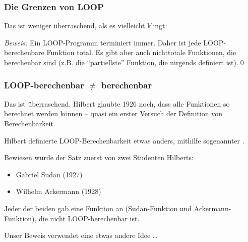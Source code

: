 \documentclass[aspectratio=1610,onlymath]{beamer}
\begin{document}
\begin{frame}\frametitle{Die Grenzen von LOOP}

\pause

Das ist weniger überraschend, als es vielleicht klingt:\smallskip

\emph{Beweis:} Ein LOOP-Programm terminiert immer. Daher ist jede LOOP-berechenbare Funktion total. Es gibt aber auch nichttotale Funktionen, die berechenbar sind (z.B. die ``partiellste'' Funktion, die nirgends definiert ist).\qed
% 
% 
% 

\end{frame}


\begin{frame}\frametitle{LOOP-berechenbar $\neq$ berechenbar}

\pause

Das ist überraschend. Hilbert glaubte 1926 noch, dass alle Funktionen so berechnet werden können -- quasi ein erster Versuch der Definition von Berechenbarkeit.

{\tiny Hilbert definierte LOOP-Berechenbarkeit etwas anders, mithilfe sogenannter .
}\pause\bigskip

Bewiesen wurde der Satz zuerst von zwei Studenten Hilberts:
\begin{itemize}
\item Gabriel Sudan (1927)
\item Wilhelm Ackermann (1928)
\end{itemize}\pause
Jeder der beiden gab eine Funktion an (Sudan-Funktion und Ackermann-Funktion), die nicht LOOP-berechenbar ist.
\bigskip

Unser Beweis verwendet eine etwas andere Idee \ldots

\end{frame}
\end{document}
